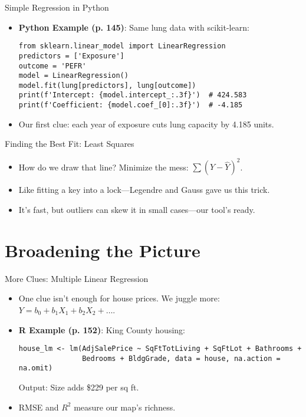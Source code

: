\documentclass{beamer}
\begin{document}
\begin{frame}[fragile]{Simple Regression in Python}
  \begin{itemize}
    \item \textbf{Python Example (p. 145)}: Same lung data with scikit-learn:
      \lstset{language=Python}
      \begin{lstlisting}
from sklearn.linear_model import LinearRegression
predictors = ['Exposure']
outcome = 'PEFR'
model = LinearRegression()
model.fit(lung[predictors], lung[outcome])
print(f'Intercept: {model.intercept_:.3f}')  # 424.583
print(f'Coefficient: {model.coef_[0]:.3f}')  # -4.185
      \end{lstlisting}
    \item Our first clue: each year of exposure cuts lung capacity by 4.185 units.
  \end{itemize}
\end{frame}

\begin{frame}{Finding the Best Fit: Least Squares}
  \begin{itemize}
    \item How do we draw that line? Minimize the mess: $\sum (Y - \hat{Y})^2$.
    \item Like fitting a key into a lock—Legendre and Gauss gave us this trick.
    \item It’s fast, but outliers can skew it in small cases—our tool’s ready.
  \end{itemize}
\end{frame}

\section{Broadening the Picture}

\begin{frame}[fragile]{More Clues: Multiple Linear Regression}
  \begin{itemize}
    \item One clue isn’t enough for house prices. We juggle more: $Y = b_0 + b_1X_1 + b_2X_2 + \dots$.
    \item \textbf{R Example (p. 152)}: King County housing:
      \begin{lstlisting}
house_lm <- lm(AdjSalePrice ~ SqFtTotLiving + SqFtLot + Bathrooms +
               Bedrooms + BldgGrade, data = house, na.action = na.omit)
      \end{lstlisting}
      Output: Size adds \$229 per sq ft.
    \item RMSE and $R^2$ measure our map’s richness.
  \end{itemize}
\end{frame}
\end{document}
